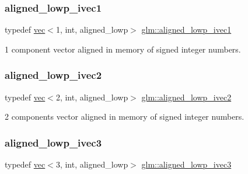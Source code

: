 \subsubsection{\texorpdfstring{aligned\+\_\+lowp\+\_\+ivec1}{aligned\_lowp\_ivec1}}
{\footnotesize\ttfamily typedef \hyperlink{structglm_1_1vec}{vec}$<$1, int, aligned\+\_\+lowp$>$ \hyperlink{group__gtc__type__aligned_gadf9e665b78c3aead513e9505fa31f9e2}{glm\+::aligned\+\_\+lowp\+\_\+ivec1}}



1 component vector aligned in memory of signed integer numbers. 

\mbox{\label{group__gtc__type__aligned_ga186cb1ada403d7a52411f64c83295486}} 
\subsubsection{\texorpdfstring{aligned\+\_\+lowp\+\_\+ivec2}{aligned\_lowp\_ivec2}}
{\footnotesize\ttfamily typedef \hyperlink{structglm_1_1vec}{vec}$<$2, int, aligned\+\_\+lowp$>$ \hyperlink{group__gtc__type__aligned_ga186cb1ada403d7a52411f64c83295486}{glm\+::aligned\+\_\+lowp\+\_\+ivec2}}



2 components vector aligned in memory of signed integer numbers. 

\mbox{\label{group__gtc__type__aligned_ga2862680efddc950ffe37245cb49dd960}} 
\subsubsection{\texorpdfstring{aligned\+\_\+lowp\+\_\+ivec3}{aligned\_lowp\_ivec3}}
{\footnotesize\ttfamily typedef \hyperlink{structglm_1_1vec}{vec}$<$3, int, aligned\+\_\+lowp$>$ \hyperlink{group__gtc__type__aligned_ga2862680efddc950ffe37245cb49dd960}{glm\+::aligned\+\_\+lowp\+\_\+ivec3}}



